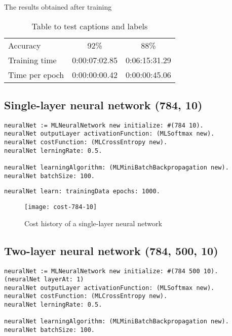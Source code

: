 The results obtained after training

\begin{table}[h!]
  \renewcommand\arraystretch{1.2}
  \centering
  
  \begin{tabularx}{0.75\textwidth}{|H|CC|}
    \hline
                    &              &  \\
    \hline
    Accuracy        & 92\%              & 88\% \\
    Training time   & 0:00:07:02.85     & 0:06:15:31.29 \\
    Time per epoch  & 0:00:00:00.42     & 0:00:00:45.06 \\
    \hline
  \end{tabularx}
  
  \caption{Table to test captions and labels}
  \label{table:results}
\end{table}

\subsection{Single-layer neural network (784, 10)}

\begin{lstlisting}
neuralNet := MLNeuralNetwork new initialize: #(784 10).
neuralNet outputLayer activationFunction: (MLSoftmax new).
neuralNet costFunction: (MLCrossEntropy new).
neuralNet lerningRate: 0.5.

neuralNet learningAlgorithm: (MLMiniBatchBackpropagation new).
neuralNet batchSize: 100.
\end{lstlisting}

\begin{lstlisting}
neuralNet learn: trainingData epochs: 1000.
\end{lstlisting}

\begin{figure}[H]
  \centering
  \texttt{[image: cost-784-10]}
  \caption{Cost history of a single-layer neural network}
  \label{fig:cost-784-10}
\end{figure}

\subsection{Two-layer neural network (784, 500, 10)}

\begin{lstlisting}
neuralNet := MLNeuralNetwork new initialize: #(784 500 10).
(neuralNet layerAt: 1)
neuralNet outputLayer activationFunction: (MLSoftmax new).
neuralNet costFunction: (MLCrossEntropy new).
neuralNet lerningRate: 0.5.

neuralNet learningAlgorithm: (MLMiniBatchBackpropagation new).
neuralNet batchSize: 100.
\end{lstlisting}

